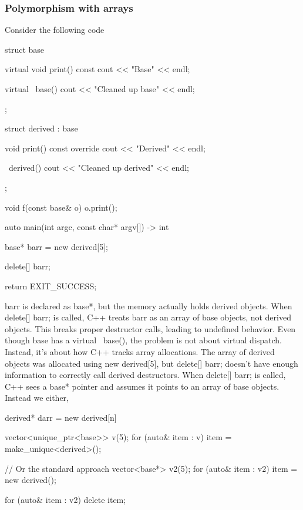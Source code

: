 \documentclass{report}
\begin{document}
    \subsubsection{Polymorphism with arrays}
    \bigbreak \noindent 
    Consider the following code
    \bigbreak \noindent 
    \begin{cppcode}
        struct base {
            virtual void print() const {
                cout << "Base" << endl;
            }

            virtual ~base() {
                cout << "Cleaned up base" << endl;
            }
        };

        struct derived : base {
            void print() const override {
                cout << "Derived" << endl;
            }

            ~derived() {
                cout << "Cleaned up derived" << endl;
            }
        };

        void f(const base& o) {
            o.print();
        }

        auto main(int argc, const char* argv[]) -> int {
            base* barr = new derived[5];

            delete[] barr;

            return EXIT_SUCCESS;
        }
    \end{cppcode}
    \bigbreak \noindent 
    barr is declared as base*, but the memory actually holds derived objects. When delete[] barr; is called, C++ treats barr as an array of base objects, not derived objects. This breaks proper destructor calls, leading to undefined behavior.
    \bigbreak \noindent 
    Even though base has a virtual ~base(), the problem is not about virtual dispatch. Instead, it's about how C++ tracks array allocations.
    \bigbreak \noindent 
    The array of derived objects was allocated using new derived[5], but delete[] barr; doesn’t have enough information to correctly call derived destructors.
    \bigbreak \noindent 
    When delete[] barr; is called, C++ sees a base* pointer and assumes it points to an array of base objects.
    \bigbreak \noindent 
    Instead we either,
    \begin{cppcode}
        derived* darr = new derived[n]
    \end{cppcode}
    \bigbreak \noindent 
    \begin{cppcode}
        vector<unique_ptr<base>> v(5);
        for (auto& item : v) {
            item = make_unique<derived>();
        }

        // Or the standard approach
        vector<base*> v2(5);
        for (auto& item : v2) {
            item = new derived();
        }

        for (auto& item : v2) {
            delete item;
        }
    \end{cppcode}
\end{document}
